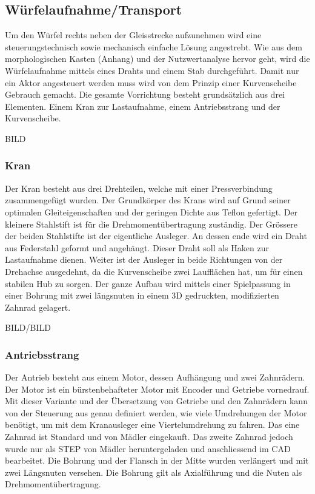 \documentclass[../../main.tex]{subfiles}
\begin{document}
    \subsection{Würfelaufnahme/Transport}
        Um den Würfel rechts neben der Gleisstrecke aufzunehmen wird eine steuerungstechnisch sowie mechanisch einfache Lösung angestrebt. Wie aus dem morphologischen Kasten (Anhang) und der Nutzwertanalyse hervor geht, wird die Würfelaufnahme mittels eines Drahts und einem Stab durchgeführt. Damit nur ein Aktor angesteuert werden muss wird von dem Prinzip einer Kurvenscheibe Gebrauch gemacht.  Die gesamte Vorrichtung besteht grundsätzlich aus drei Elementen. Einem Kran zur Lastaufnahme, einem Antriebsstrang und der Kurvenscheibe.

BILD

    \subsubsection{Kran}
        Der Kran besteht aus drei Drehteilen, welche mit einer Pressverbindung zusammengefügt wurden. Der Grundkörper des Krans wird auf Grund seiner optimalen Gleiteigenschaften und der geringen Dichte aus Teflon gefertigt. Der kleinere Stahlstift ist für die Drehmomentübertragung zuständig. Der Grössere der beiden Stahlstifte ist der eigentliche Ausleger. An dessen ende wird ein Draht aus Federstahl geformt und angehängt. Dieser Draht soll als Haken zur Lastaufnahme dienen. Weiter ist der Ausleger in beide Richtungen von der Drehachse ausgedehnt, da die Kurvenscheibe zwei Laufflächen hat, um für einen stabilen Hub zu sorgen. Der ganze Aufbau wird mittels einer Spielpassung in einer Bohrung mit zwei längsnuten in einem 3D gedruckten, modifizierten Zahnrad gelagert. 

BILD/BILD


    \subsubsection{Antriebsstrang}
        Der Antrieb besteht aus einem Motor, dessen Aufhängung und zwei Zahnrädern. Der Motor ist ein bürstenbehafteter Motor mit Encoder und Getriebe vornedrauf. Mit dieser Variante und der Übersetzung von Getriebe und den Zahnrädern kann von der Steuerung aus genau definiert werden, wie viele Umdrehungen der Motor benötigt, um mit dem Kranausleger eine Viertelumdrehung zu fahren. Das eine Zahnrad ist Standard und von Mädler eingekauft. Das zweite Zahnrad jedoch wurde nur als STEP von Mädler heruntergeladen und anschliessend im CAD bearbeitet. Die Bohrung und der Flansch in der Mitte wurden verlängert und mit zwei Längsnuten versehen. Die Bohrung gilt als Axialführung und die Nuten als Drehmomentübertragung.
\end{document}
